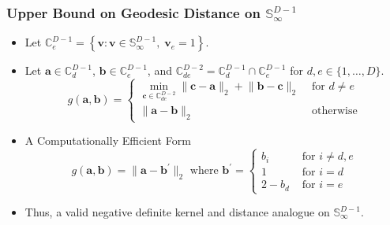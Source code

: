 \documentclass[aspectratio=169,10pt]{beamer}
\begin{document}
\begin{frame}
    \frametitle{Upper Bound on Geodesic Distance on $\mathbb{S}_{\infty}^{D-1}$}
    \label{pgpareto:kerneldetails}
    \begin{itemize}
        \item Let $\mathbb{C}_e^{D-1} = \left\lbrace\bm{v} : \bm{v} \in 
            \mathbb{S}_{\infty}^{D-1},\;\bm{v}_e = 1\right\rbrace$.
        \item Let $\bm{a}\in \mathbb{C}_d^{D-1}$, $\bm{b}\in\mathbb{C}_e^{D-1}$, and
            $\mathbb{C}_{de}^{D-2} = \mathbb{C}_d^{D-1}\cap \mathbb{C}_e^{D-1}$
            for $d,e\in \lbrace 1,\ldots,D\rbrace$.
            \[
            g(\bm{a},\bm{b}) = \begin{cases}
                \min\limits_{\bm{c}\in\mathbb{C}_{de}^{D-2}}\lVert \bm{c} - \bm{a}\rVert_2 + 
                    \lVert \bm{b} - \bm{c}\rVert_2 &\text{ for }d\neq e\\
            \lVert \bm{a} - \bm{b}\rVert_2 &\text{ otherwise}
            \end{cases}
            \]
        \item A Computationally Efficient Form
        \[
            g(\bm{a},\bm{b}) = \lVert \bm{a} - \bm{b}^{\prime}\lVert_2 
            \text{ where }\bm{b}^{\prime} = \begin{cases}
                b_i &\text{ for }i\neq d,e\\
                1 &\text{ for }i = d\\
                2 - b_d &\text{ for }i = e
                \end{cases}
        \]
        \item Thus, a valid negative definite kernel and distance analogue on $\mathbb{S}_{\infty}^{D-1}$.
    \end{itemize}
    \hyperlink{pgpareto:energyscore}{}
\end{frame} %
\end{document}
